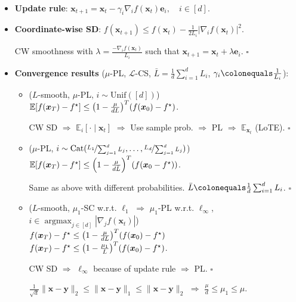 \documentclass[8pt,a4paper]{extarticle}
\renewcommand{\proof}[1]{\begin{tcolorbox}#1 \hfill $\square$\end{tcolorbox}}
\DeclareMathOperator*{\argmax}{argmax}
\newcommand{\lft}{\mathopen{}\mathclose\bgroup\left}
\newcommand{\rgt}{\aftergroup\egroup\right}
\newcommand{\E}{\mathbb{E}}
\renewcommand{\vec}[1]{\bm{#1}}
\newenvironment{topic}[1]
{\textbf{\sffamily \colorbox{black}{\rlap{\textbf{\textcolor{white}{#1}}}\hspace{\linewidth}\hspace{-2\fboxsep}}} \\ \vspace{0.2cm}}
{}
\begin{document}
\begin{multicols*}{2}
    \begin{topic}{Coordinate descent}
        \begin{itemize}
            \item \textbf{Update rule}: $\vec{x}_{t+1} = \vec{x}_t - \gamma_i \nabla_i f(\vec{x}_t) \vec{e}_i, \quad i \in [d]$.
            \item \textbf{Coordinate-wise SD}: $f(\vec{x}_{t+1}) \leq f(\vec{x}_t) - \frac{1}{2L_i} |\nabla_i f(\vec{x}_t)|^2$.
                  \proof{CW smoothness with $\lambda = \frac{-\nabla_i f(\vec{x}_t)}{L_i}$ such that $\vec{x}_{t+1} = \vec{x}_t + \lambda \vec{e}_i$.}
            \item \textbf{Convergence results} ($\mu$-PL, $\mathcal{L}$-CS, $\bar{L} = \frac{1}{d} \sum_{i=1}^{d} L_i$, $\gamma_i \colonequals \frac{1}{L_i}$):
                  \begin{itemize}
                      \item ($L$-smooth, $\mu$-PL, $i \sim \mathrm{Unif}([d])$) \\
                            $\E[f(\vec{x}_T) - f^\star] \leq \lft( 1 - \frac{\mu}{dL} \rgt)^T(f(\vec{x}_0) - f^\star)$.
                            \proof{CW SD $\Rightarrow$ $\E_i[\cdot \mid \vec{x}_t]$ $\Rightarrow$ Use sample prob. $\Rightarrow$ PL $\Rightarrow$ $\E_{\vec{x}_t}$ (LoTE).}
                      \item ($\mu$-PL, $i \sim \mathrm{Cat}(\nicefrac{L_1}{\sum_{j=1}^{d} L_j}, \ldots, \nicefrac{L_d}{\sum_{j=1}^{d} L_j})$) \\
                            $\E[f(\vec{x}_T) - f^\star] \leq \lft( 1 - \frac{\mu}{d \bar{L}} \rgt)^T (f(\vec{x}_0 - f^\star))$.
                            \proof{Same as above with different probabilities. $\bar{L} \colonequals \frac{1}{d} \sum_{i=1}^{d} L_i$.}
                      \item ($L$-smooth, $\mu_1$-SC w.r.t. $\ell_1$ $\Rightarrow$ $\mu_1$-PL w.r.t. $\ell_{\infty}$, $i \in \argmax_{j\in[d]} |\nabla_j f(\vec{x}_t)|$) \\
                            $f(\vec{x}_T) - f^\star \leq \lft( 1 - \frac{\mu}{dL} \rgt)^T (f(\vec{x}_0) - f^\star)$ \\
                            $f(\vec{x}_T) - f^\star \leq \lft( 1 - \frac{\mu_1}{L} \rgt)^T (f(\vec{x}_0) - f^\star)$.
                            \proof{CW SD $\Rightarrow$ $\ell_{\infty}$ because of update rule $\Rightarrow$ PL.}
                            $\frac{1}{\sqrt{d}} \| \vec{x} - \vec{y} \|_2 \leq \| \vec{x} - \vec{y} \|_1 \leq \| \vec{x} - \vec{y} \|_2$ $\Rightarrow$ $\frac{\mu}{d} \leq \mu_1 \leq \mu$.
                  \end{itemize}
        \end{itemize}
    \end{topic}


\end{multicols*}
\end{document}
